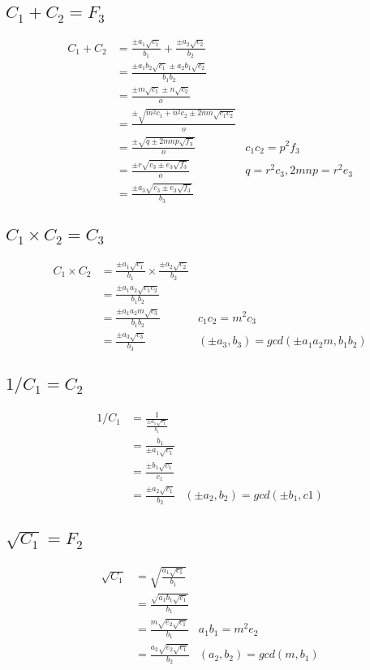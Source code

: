 \documentclass{article}
\begin{document}
\subsection{$C_1 + C_2 = F_3$} %
\begin{align*}
 C_1 + C_2 &= \frac{\pm a_1\sqrt{c_1}}{b_1} + \frac{\pm a_2\sqrt{c_2}}{b_2} \\
 &= \frac{\pm a_1b_2\sqrt{c_1} \pm a_2b_1\sqrt{c_2}}{b_1b_2} \\
 &= \frac{\pm m\sqrt{c_1} \pm n\sqrt{c_2}}{o} \\
 &= \frac{\pm \sqrt{m^2c_1 + n^2c_2 \pm 2mn\sqrt{c_1c_2}}}{o} \\
 &= \frac{\pm \sqrt{q \pm 2mnp\sqrt{f_3}}}{o}     & c_1c_2 = p^2f_3\\
 &= \frac{\pm r\sqrt{c_3 \pm e_3\sqrt{f_3}}}{o}   & q = r^2c_3, 2mnp = r^2e_3 \\
 &= \frac{\pm a_3\sqrt{c_3 \pm e_3\sqrt{f_3}}}{b_3}
\end{align*}



\subsection{$C_1 \times C_2 = C_3$}
\begin{align*}
C_1 \times C_2 &= \frac{\pm a_1\sqrt{c_1}}{b_1} \times \frac{\pm a_2\sqrt{c_2}}{b_2}\\
 &= \frac{\pm a_1a_2\sqrt{c_1c_2}}{b_1b_2}\\
 &= \frac{\pm a_1a_2m\sqrt{c_3}}{b_1b_2} & c_1c_2 = m^2c_3\\
 &= \frac{\pm a_3\sqrt{c_3}}{b_3} & (\pm a_3,b_3) = gcd(\pm a_1a_2m,b_1b_2)
\end{align*}


\subsection{$1 / C_1 = C_2$}
\begin{align*}
1 / C_1 &= \frac{1}{\frac{\pm a_1\sqrt{c_1}}{b_1}} \\
 &= \frac{b_1}{\pm a_1\sqrt{c_1}}\\
 &= \frac{\pm b_1\sqrt{c_1}}{c_1}\\
 &= \frac{\pm a_2\sqrt{c_1}}{b_2}  & (\pm a_2, b_2) = gcd(\pm b_1, c1)
\end{align*}


\subsection{$\sqrt{C_1} = F_2$} %
\begin{align*}
\sqrt{C_1} &= \sqrt{\frac{a_1\sqrt{c_1}}{b_1}}\\
 &= \frac{\sqrt{a_1b_1\sqrt{c_1}}}{b_1}     \\
 &= \frac{m\sqrt{e_2\sqrt{c_1}}}{b_1}       & a_1b_1 = m^2e_2\\
 &= \frac{a_2\sqrt{e_2\sqrt{c_1}}}{b_2}     & (a_2,b_2) = gcd(m,b_1)
\end{align*}
\end{document}
